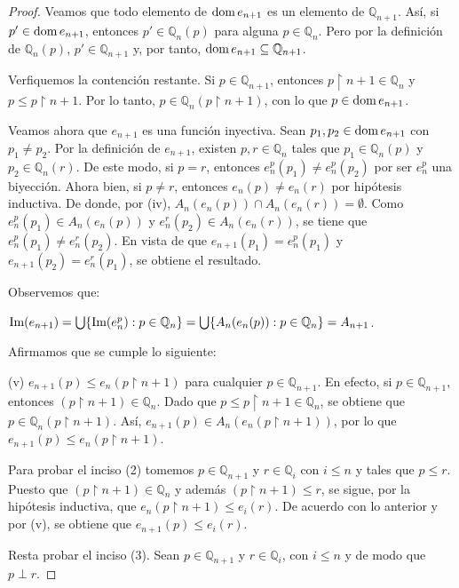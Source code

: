 \documentclass[11pt]{unam_tesis1}
\theoremstyle{MyThmStyle}
\theoremstyle{definition}
\theoremstyle{plain}
\theoremstyle{remark}
\def\dom{\mathop{\rm dom}\nolimits}
\def\rest{\mathop{\upharpoonright}\nolimits}
\let\leq\leqslant
\begin{document}
\begin{proof}
Veamos que todo elemento de $\dom e_{n+1}$ es un elemento de $\mathbb Q_{n+1}$. As\'i, si $p'\in \dom e_{n+1}$, entonces $p'\in \mathbb Q_n(p)$ para alguna $p\in \mathbb Q_n$. Pero por la definici\'on de $\mathbb Q_n(p)$, $p'\in \mathbb Q_{n+1}$ y, por tanto, $\dom e_{n+1}\subseteq \mathbb Q_{n+1}$. 

Verfiquemos la contenci\'on restante. Si $p\in \mathbb Q_{n+1}$, entonces $p\rest n+1 \in \mathbb Q_{n}$ y $p\leq p\rest n+1$. Por lo tanto, $p\in \mathbb Q_n(p\rest n+1)$, con lo que $p\in \dom e_{n+1}$.

Veamos ahora que $e_{n+1}$ es una funci\'on inyectiva. Sean $p_1,p_2\in \dom e_{n+1}$ con $p_1\neq p_2$. Por la definici\'on de $e_{n+1}$, existen $p,r\in \mathbb Q_n$ tales que $p_1\in \mathbb Q_n(p)$ y $p_2\in \mathbb Q_n(r)$. De este modo, si $p=r$, entonces $e_n^{p}(p_1)\neq e_n^{p}(p_2)$ por ser $e_n^{p}$ una biyecci\'on. Ahora bien, si $p\neq r$, entonces $e_n(p)\neq e_n(r)$ por hip\'otesis inductiva. De donde, por (iv), $A_n(e_n(p))\cap A_n(e_n(r))=\emptyset$. Como $e_n^p(p_1)\in A_n(e_n(p))$ y $e_n^r(p_2)\in A_n(e_n(r))$, se tiene que $e_n^p(p_1)\neq e_n^r(p_2)$. En vista de que $e_{n+1}(p_1)=e_n^p(p_1)$ y $e_{n+1}(p_2)=e_n^r(p_1)$, se obtiene el resultado.

Observemos que:

\begin{center}
$\textnormal{Im}(e_{n+1})=\bigcup \{\textnormal{Im}(e^{p}_n): p\in \mathbb Q_n\}=\bigcup \{A_n(e_n(p)): p\in \mathbb Q_n\}= A_{n+1}$.
\end{center}

Afirmamos que se cumple lo siguiente:

(v) $e_{n+1}(p) \leq e_n(p\rest n+1)$ para cualquier $p\in \mathbb Q_{n+1}$. En efecto, si $p\in \mathbb Q_{n+1}$, entonces $(p\rest n+1)\in \mathbb Q_n$. Dado que $p\leq p\rest n+1\in \mathbb Q_n$, se obtiene que $p\in \mathbb Q_n(p\rest n+1)$. As\'i, $e_{n+1}(p)\in A_n(e_n(p\rest n+1))$, por lo que  $e_{n+1}(p)\leq e_n(p\rest n+1)$.

Para probar el inciso (2) tomemos $p\in \mathbb Q_{n+1}$ y $r\in \mathbb Q_i$ con $i\leq n$ y tales que $p\leq r$. Puesto que $(p\rest n+1)\in \mathbb Q_n$ y adem\'as $(p\rest n+1) \leq r$, se sigue, por la hip\'otesis inductiva, que $e_{n}(p\rest n+1)\leq e_i(r)$. De acuerdo con lo anterior y por (v), se obtiene que $e_{n+1}(p)\leq e_i(r)$.

Resta probar el inciso (3). Sean $p\in \mathbb Q_{n+1}$ y $r\in \mathbb Q_i$, con $i\leq n$ y de modo que $p\perp r$.


\end{proof}
\end{document}
